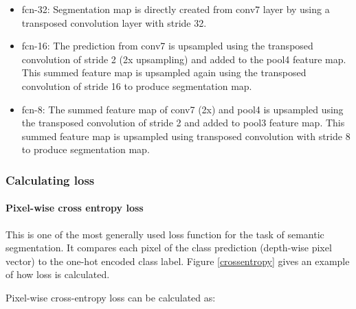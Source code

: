 \begin{itemize}

\item \ac{fcn}-32: Segmentation map is directly created from conv7 layer by using a transposed convolution layer with stride 32.
    
\item \ac{fcn}-16: The prediction from conv7 is upsampled using the transposed convolution of stride 2 (2x upsampling) and added to the pool4 feature map. This summed feature map is upsampled again using the transposed convolution of stride 16 to produce segmentation map. 


    
    
\item \ac{fcn}-8: The summed feature map of conv7 (2x) and pool4 is upsampled using the transposed convolution of stride 2 and added to pool3 feature map. This summed feature map is upsampled using transposed convolution with stride 8 to produce segmentation map. 



\end{itemize}


\subsubsection{Calculating loss}

\paragraph{Pixel-wise cross entropy loss}

This is one of the most generally used loss function for the task of semantic segmentation. It compares each pixel of the class prediction (depth-wise pixel vector) to the one-hot encoded class label. 
Figure \ref{crossentropy} gives an example of how loss is calculated.
\par
Pixel-wise cross-entropy loss can be calculated as: 


